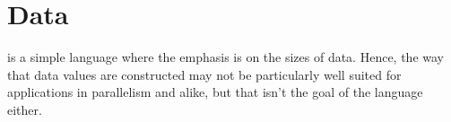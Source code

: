 \section{Data}

 is a simple language where the emphasis is on the sizes of data.
Hence, the way that data values are constructed may not be particularly well
suited for applications in parallelism and alike, but that isn't the goal of
the language either.
